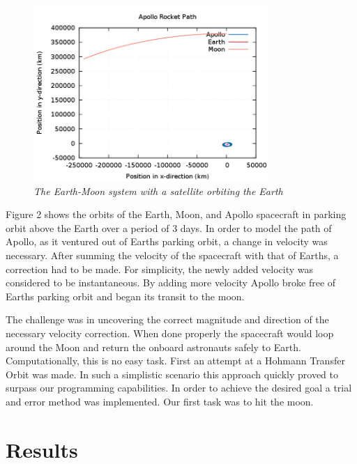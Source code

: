 \documentclass[11pt]{article}
\begin{document}
\begin{figure}[H]
  \begin{center}
\centerline{\includegraphics[width=3.5in]{3days.png}}
\caption{\it \small{The Earth-Moon system with a satellite orbiting the Earth \label{fig2}}}
  \end{center}
\end{figure}
Figure 2 shows the orbits of the Earth, Moon, and Apollo spacecraft in parking orbit above the Earth over a period of 3 days.  
In order to model the path of Apollo, as it ventured out of Earths parking orbit, a change in velocity was necessary.  After 
summing the velocity of the spacecraft with that of Earths, a correction had to be made.  For simplicity, the newly added 
velocity was considered to be instantaneous.  By adding more velocity Apollo broke free of Earths parking orbit and began
its transit to the moon.  


The challenge was in uncovering the correct magnitude and direction of the necessary velocity 
correction.  When done properly the spacecraft would loop around the Moon and return the onboard astronauts safely to Earth.  
Computationally, this is no easy task.  First an attempt at a Hohmann Transfer Orbit was made.  In such a simplistic 
scenario this approach quickly proved to surpass our programming capabilities.  In order to achieve the desired goal a 
trial and error method was implemented.  Our first task was to hit the moon.



\section{Results}
\end{document}
